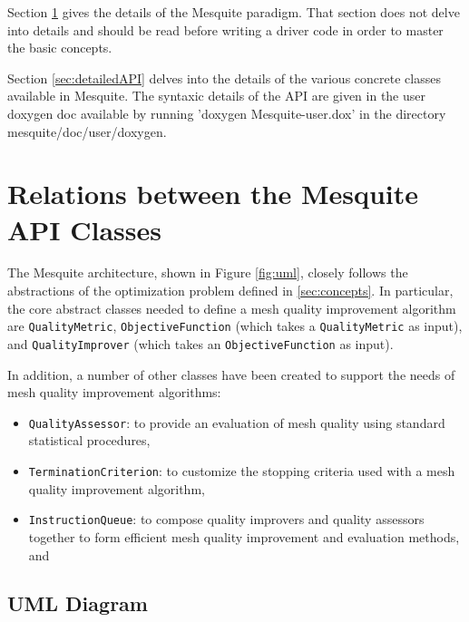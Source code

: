 \documentclass[letter]{report}
\begin{document}
Section \ref{sec:classesRelations} gives the details of the Mesquite paradigm. That section does not
delve into details and should be read before writing a driver code in order to master the basic
concepts. 

Section \ref{sec:detailedAPI} delves into the details of the various concrete classes available in
Mesquite. The syntaxic details of the API are given in the user doxygen doc available by running
'doxygen Mesquite-user.dox' in the directory mesquite/doc/user/doxygen. 

\section{Relations between the Mesquite API Classes} \label{sec:classesRelations}

The Mesquite architecture, shown in Figure \ref{fig:uml}, closely
follows the abstractions of the optimization problem defined in \ref{sec:concepts}.
In particular, the core abstract classes needed to
define a mesh quality improvement algorithm are {\tt QualityMetric},
{\tt ObjectiveFunction} (which takes a {\tt QualityMetric} as
input), and {\tt QualityImprover} (which takes an {\tt ObjectiveFunction}
as input).

In addition, a number of other classes have been created to support
the needs of mesh quality improvement algorithms:
\begin{itemize}
\item {\tt QualityAssessor}: to provide an evaluation of mesh
quality using standard statistical procedures,
\item {\tt TerminationCriterion}: to customize the stopping criteria
used with a mesh quality improvement algorithm,
\item {\tt InstructionQueue}: to compose quality improvers and
quality assessors together to form efficient mesh quality improvement
and evaluation methods, and
\end{itemize}

\subsection{UML Diagram}
\end{document}

